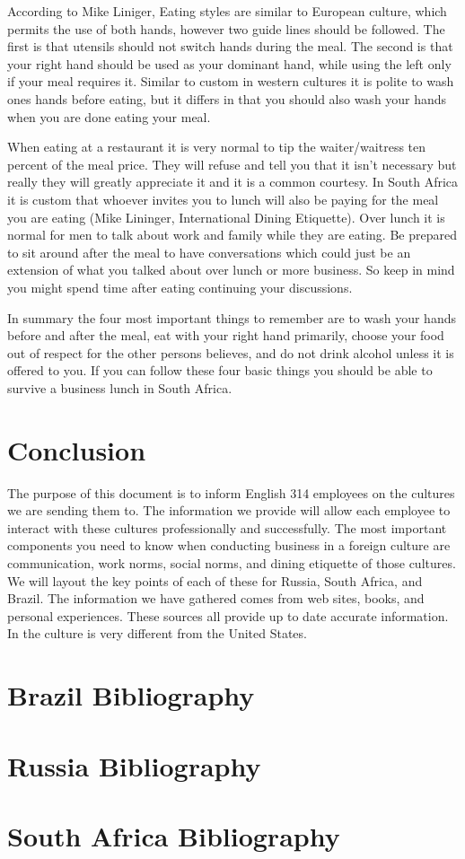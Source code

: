 \documentclass[11pt,a4paper,twoside]{report}
\begin{document}
According to Mike Liniger, Eating styles are similar to European culture, which
permits the use of both hands, however two guide lines should be followed. The
first is that utensils should not switch hands during the meal.  The second is
that your right hand should be used as your dominant hand, while using the left
only if your meal requires it. Similar to custom in western cultures it is
polite to wash ones hands before eating, but it differs in that you should also
wash your hands when you are done eating your meal.

When eating at a restaurant it is very normal to tip the waiter/waitress ten
percent of the meal price. They will refuse and tell you that it isn’t
necessary but really they will greatly appreciate it and it is a common
courtesy. In South Africa it is custom that whoever invites you to lunch will
also be paying for the meal you are eating (Mike Lininger, International Dining
Etiquette). Over lunch it is normal for men to talk about work and family while
they are eating. Be prepared to sit around after the meal to have conversations
which could just be an extension of what you talked about over lunch or more
business. So keep in mind you might spend time after eating continuing your
discussions.

In summary the four most important things to remember are to wash your hands
before and after the meal, eat with your right hand primarily, choose your food
out of respect for the other persons believes, and do not drink alcohol unless
it is offered to you. If you can follow these four basic things you should be
able to survive a business lunch in South Africa.

\chapter{Conclusion}

The purpose of this document is to inform English 314 employees on the cultures
we are sending them to.  The information we provide will allow each employee to
interact with these cultures professionally and successfully. The most
important components you need to know when conducting business in a foreign
culture are communication, work norms, social norms, and dining etiquette of
those cultures. We will layout the key points of each of these for Russia,
South Africa, and Brazil. The information we have gathered comes from web
sites, books, and personal experiences. These sources all provide up to date
accurate information. In the culture is very different from the United
States.

\appendix

\chapter{Brazil Bibliography}

%
%

\chapter{Russia Bibliography}




\chapter{South Africa Bibliography}

%
%
\end{document}
